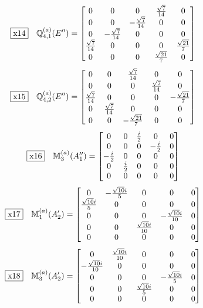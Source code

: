 \documentclass[fleqn,10pt,landscape]{jsarticle}
\begin{document}
\begin{dmath*}
\fbox{x14}\quad \mathbb{Q}_{4,1}^{(a)}(E^{\prime\prime})=\begin{bmatrix} 0 & 0 & 0 & \frac{\sqrt{7}}{14} & 0 \\ 0 & 0 & - \frac{\sqrt{7}}{14} & 0 & 0 \\ 0 & - \frac{\sqrt{7}}{14} & 0 & 0 & 0 \\ \frac{\sqrt{7}}{14} & 0 & 0 & 0 & \frac{\sqrt{21}}{7} \\ 0 & 0 & 0 & \frac{\sqrt{21}}{7} & 0 \end{bmatrix}
\end{dmath*}
\begin{dmath*}
\fbox{x15}\quad \mathbb{Q}_{4,2}^{(a)}(E^{\prime\prime})=\begin{bmatrix} 0 & 0 & \frac{\sqrt{7}}{14} & 0 & 0 \\ 0 & 0 & 0 & \frac{\sqrt{7}}{14} & 0 \\ \frac{\sqrt{7}}{14} & 0 & 0 & 0 & - \frac{\sqrt{21}}{7} \\ 0 & \frac{\sqrt{7}}{14} & 0 & 0 & 0 \\ 0 & 0 & - \frac{\sqrt{21}}{7} & 0 & 0 \end{bmatrix}
\end{dmath*}
\begin{dmath*}
\fbox{x16}\quad \mathbb{M}_{3}^{(a)}(A_{1}^{\prime\prime})=\begin{bmatrix} 0 & 0 & \frac{i}{2} & 0 & 0 \\ 0 & 0 & 0 & - \frac{i}{2} & 0 \\ - \frac{i}{2} & 0 & 0 & 0 & 0 \\ 0 & \frac{i}{2} & 0 & 0 & 0 \\ 0 & 0 & 0 & 0 & 0 \end{bmatrix}
\end{dmath*}
\begin{dmath*}
\fbox{x17}\quad \mathbb{M}_{1}^{(a)}(A_{2}^{\prime})=\begin{bmatrix} 0 & - \frac{\sqrt{10} i}{5} & 0 & 0 & 0 \\ \frac{\sqrt{10} i}{5} & 0 & 0 & 0 & 0 \\ 0 & 0 & 0 & - \frac{\sqrt{10} i}{10} & 0 \\ 0 & 0 & \frac{\sqrt{10} i}{10} & 0 & 0 \\ 0 & 0 & 0 & 0 & 0 \end{bmatrix}
\end{dmath*}
\begin{dmath*}
\fbox{x18}\quad \mathbb{M}_{3}^{(a)}(A_{2}^{\prime})=\begin{bmatrix} 0 & \frac{\sqrt{10} i}{10} & 0 & 0 & 0 \\ - \frac{\sqrt{10} i}{10} & 0 & 0 & 0 & 0 \\ 0 & 0 & 0 & - \frac{\sqrt{10} i}{5} & 0 \\ 0 & 0 & \frac{\sqrt{10} i}{5} & 0 & 0 \\ 0 & 0 & 0 & 0 & 0 \end{bmatrix}
\end{dmath*}
\end{document}

